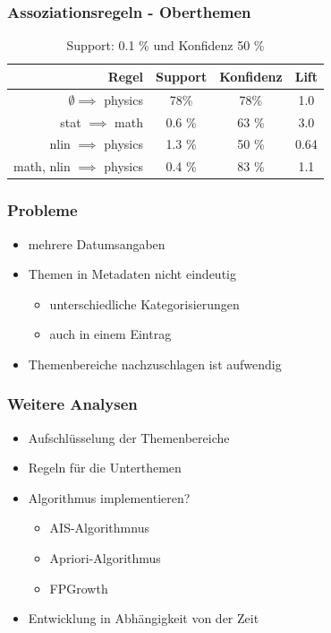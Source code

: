 \documentclass[12pt, xcolor=table]{beamer}
\begin{document}
\begin{frame}
	\frametitle{Assoziationsregeln - Oberthemen}
	\begin{center}
	\begin{table}
	\begin{tabular}{rccc}
		\tiny\textbf{Regel} &\tiny \textbf{Support} &\tiny \textbf{Konfidenz} & \tiny \textbf{Lift}\\
		\hline
		\tiny  $\emptyset \implies$ physics & \tiny 78\% &\tiny 78\% &\tiny 1.0  \\
		\tiny stat $\implies$ math  &\tiny 0.6 \% &\tiny 63 \% &\tiny 3.0 \\
		\tiny nlin $\implies$ physics  &\tiny 1.3 \% &\tiny 50 \% &\tiny 0.64 \\
		\tiny math, nlin $\implies$ physics  &\tiny 0.4 \% &\tiny 83 \% &\tiny 1.1 \\
	\end{tabular}
	 \caption*{Support: 0.1 \% und Konfidenz 50 \%}
	\end{table}
	\end{center}
\end{frame}
\begin{frame}
	\frametitle{Probleme}
	\begin{itemize}
		\item mehrere Datumsangaben
		\item Themen in Metadaten nicht eindeutig
		\begin{itemize}
			\item unterschiedliche Kategorisierungen
			\item auch in einem Eintrag
		\end{itemize}
		\item Themenbereiche nachzuschlagen ist aufwendig
	\end{itemize}
\end{frame}
\begin{frame}
	\frametitle{Weitere Analysen}
	\begin{itemize}
		\item Aufschlüsselung der Themenbereiche
		\item Regeln für die Unterthemen
		\item Algorithmus implementieren?
			\begin{itemize}
				\item AIS-Algorithmnus
				\item Apriori-Algorithmus 
				\item FPGrowth 
			\end{itemize}
		\item Entwicklung in Abhängigkeit von der Zeit
	\end{itemize}
\end{frame}
\end{document}
